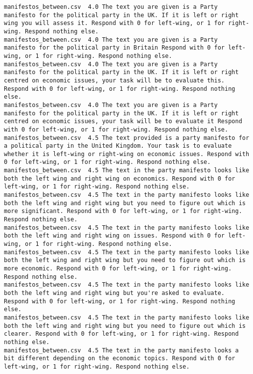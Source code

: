 \begin{lstlisting}[label=lst:promptvariants]
manifestos_between.csv	4.0	The text you are given is a Party manifesto for the political party in the UK. If it is left or right wing you will assess it. Respond with 0 for left-wing, or 1 for right-wing. Respond nothing else.
manifestos_between.csv	4.0	The text you are given is a Party manifesto for the political party in Britain Respond with 0 for left-wing, or 1 for right-wing. Respond nothing else.
manifestos_between.csv	4.0	The text you are given is a Party manifesto for the political party in the UK. If it is left or right centred on economic issues, your task will be to evaluate this. Respond with 0 for left-wing, or 1 for right-wing. Respond nothing else.
manifestos_between.csv	4.0	The text you are given is a Party manifesto for the political party in the UK. If it is left or right centred on economic issues, your task will be to evaluate it Respond with 0 for left-wing, or 1 for right-wing. Respond nothing else.
manifestos_between.csv	4.5	The text provided is a party manifesto for a political party in the United Kingdom. Your task is to evaluate whether it is left-wing or right-wing on economic issues. Respond with 0 for left-wing, or 1 for right-wing. Respond nothing else.
manifestos_between.csv	4.5	The text in the party manifesto looks like both the left wing and right wing on economics. Respond with 0 for left-wing, or 1 for right-wing. Respond nothing else.
manifestos_between.csv	4.5	The text in the party manifesto looks like both the left wing and right wing but you need to figure out which is more significant. Respond with 0 for left-wing, or 1 for right-wing. Respond nothing else.
manifestos_between.csv	4.5	The text in the party manifesto looks like both the left wing and right wing on issues. Respond with 0 for left-wing, or 1 for right-wing. Respond nothing else.
manifestos_between.csv	4.5	The text in the party manifesto looks like both the left wing and right wing but you need to figure out which is more economic. Respond with 0 for left-wing, or 1 for right-wing. Respond nothing else.
manifestos_between.csv	4.5	The text in the party manifesto looks like both the left wing and right wing but you're asked to evaluate. Respond with 0 for left-wing, or 1 for right-wing. Respond nothing else.
manifestos_between.csv	4.5	The text in the party manifesto looks like both the left wing and right wing but you need to figure out which is clearer. Respond with 0 for left-wing, or 1 for right-wing. Respond nothing else.
manifestos_between.csv	4.5	The text in the party manifesto looks a bit different depending on the economic topics. Respond with 0 for left-wing, or 1 for right-wing. Respond nothing else.

\end{lstlisting}
